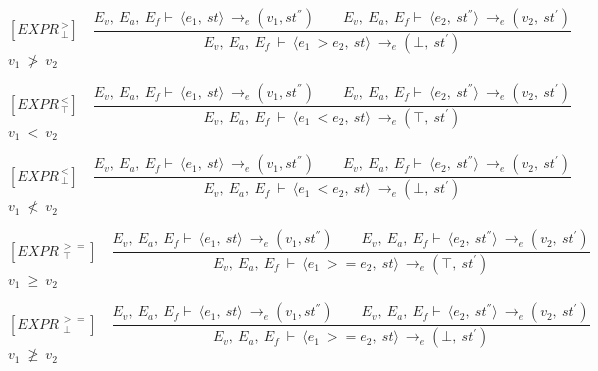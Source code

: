    	\newcommand{\exprtrans}[5][E_v, E_a,E_f]{#1\vdash \langle #2, #3 \rangle \mathrel{\to_e} (#4 , #5)}
   	
   	\[
   	[EXPR^{\ >}_{\ \bot}] \quad
   	\dfrac{E_v, \ E_a, \ E_f \vdash \ \langle e_1, \ st \rangle \ \rightarrow_e (v_1, st^{''}) \qquad E_v, \ E_a, \ E_f \vdash \ \langle e_2, \ st^{''} \rangle \ \rightarrow_e (v_2, \ st^{'})}{E_v, \ E_a, \ E_f \ \vdash \ \langle e_1 \ > e_2, \ st \rangle \ \rightarrow_e (\bot, \ st^{'})}
   	\]
	\begin{math}
   	v_1 \ \not> \ v_2
   	\end{math}   
   	
   	\[
   	[EXPR^{\ <}_{\ \top}] \quad
   	\dfrac{E_v, \ E_a, \ E_f \vdash \ \langle e_1, \ st \rangle \ \rightarrow_e (v_1, st^{''}) \qquad E_v, \ E_a, \ E_f \vdash \ \langle e_2, \ st^{''} \rangle \ \rightarrow_e (v_2, \ st^{'})}{E_v, \ E_a, \ E_f \ \vdash \ \langle e_1 \ < e_2, \ st \rangle \ \rightarrow_e (\top, \ st^{'})}
   	\]
	\begin{math}
   	v_1 \ < \ v_2
   	\end{math}   	
   	

   	\[
   	[EXPR^{\ <}_{\ \bot}] \quad
   	\dfrac{E_v, \ E_a, \ E_f \vdash \ \langle e_1, \ st \rangle \ \rightarrow_e (v_1, st^{''}) \qquad E_v, \ E_a, \ E_f \vdash \ \langle e_2, \ st^{''} \rangle \ \rightarrow_e (v_2, \ st^{'})}{E_v, \ E_a, \ E_f \ \vdash \ \langle e_1 \ < e_2, \ st \rangle \ \rightarrow_e (\bot, \ st^{'})}
   	\]
	\begin{math}
   	v_1 \ \not< \ v_2
   	\end{math}
   	
   	\[
   	[EXPR^{\ >=}_{\ \ \top}] \quad
   	\dfrac{E_v, \ E_a, \ E_f \vdash \ \langle e_1, \ st \rangle \ \rightarrow_e (v_1, st^{''}) \qquad E_v, \ E_a, \ E_f \vdash \ \langle e_2, \ st^{''} \rangle \ \rightarrow_e (v_2, \ st^{'})}{E_v, \ E_a, \ E_f \ \vdash \ \langle e_1 \ >= e_2, \ st \rangle \ \rightarrow_e (\top, \ st^{'})}
   	\]
	\begin{math}
   	v_1 \ \ge \ v_2
   	\end{math}   	
   	

   	\[
   	[EXPR^{\ >=}_{\ \ \bot}] \quad
   	\dfrac{E_v, \ E_a, \ E_f \vdash \ \langle e_1, \ st \rangle \ \rightarrow_e (v_1, st^{''}) \qquad E_v, \ E_a, \ E_f \vdash \ \langle e_2, \ st^{''} \rangle \ \rightarrow_e (v_2, \ st^{'})}{E_v, \ E_a, \ E_f \ \vdash \ \langle e_1 \ >= e_2, \ st \rangle \ \rightarrow_e (\bot, \ st^{'})}
   	\]
	\begin{math}
   	v_1 \ \ngeq \ v_2
   	\end{math}
   	
